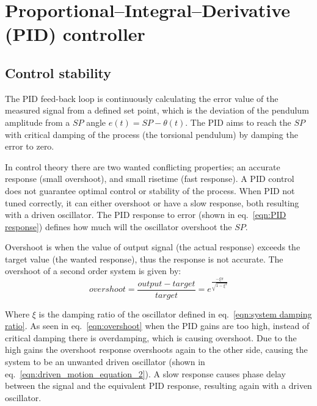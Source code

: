 \documentclass[\main/master.tex]{subfiles}
\begin{document}
\section{Proportional–Integral–Derivative (PID) controller}
\subsection{Control stability}
The PID feed-back loop is continuously calculating the error value of the measured signal from a defined set point, which is the deviation of the pendulum amplitude from a $SP$ angle $e(t) =SP -\theta(t) $. The PID aims to reach the $SP$ with critical damping of the process (the torsional pendulum) by damping the error to zero. 
\par\noindent
In control theory there are two wanted conflicting properties; an accurate response (small overshoot), and small risetime (fast response). A PID control does not guarantee optimal control or stability of the process. When PID not tuned correctly, it can either overshoot or have a slow response, both resulting with a driven oscillator. The PID response to error (shown in eq.~\ref{eqn:PID response}) defines how much will the oscillator overshoot the $SP$.
\par\noindent
Overshoot is when the value of output signal (the actual response) exceeds the target value (the wanted response), thus the response is not accurate. The overshoot of a second order system is given by:
\begin{equation}
overshoot =  \frac{output-target}{target} = e ^{\frac{-\xi\pi}{\sqrt{1-\xi^2}}}  \label{eqn:overshoot}
\end{equation}
\par\noindent
Where $\xi$ is the damping ratio of the oscillator defined in eq.~\ref{eqn:system damping ratio}. As seen in eq.~\ref{eqn:overshoot} when the PID gains are too high, instead of critical damping there is overdamping, which is causing overshoot. Due to the high gains the overshoot response overshoots again to the other side, causing the system to be an unwanted driven oscillator (shown in eq.~\ref{eqn:driven_motion_equation_2}). A slow response causes phase delay between the signal and the equivalent PID response, resulting  again with a driven oscillator.
\end{document}
